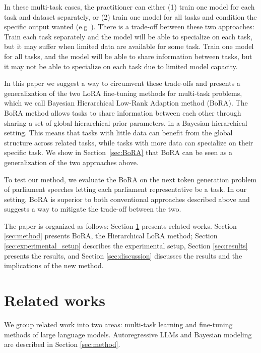 \documentclass[fullpaper]{nldl}
\begin{document}
In these multi-task cases, the practitioner can either (1) train one model for each task and dataset separately, or (2) train one model for all tasks and condition the specific output wanted (e.g~\cite{Raffel2019}).
There is a trade-off between these two approaches: Train each task separately and the model will be able to specialize on each task, but it may suffer when limited data are available for some task. Train one model for all tasks, and the model will be able to share information between tasks, but it may not be able to specialize on each task due to limited model capacity.

In this paper we suggest a way to circumvent these trade-offs and presents a generalization of the two LoRA fine-tuning methods for multi-task problems, which we call Bayesian Hierarchical Low-Rank Adaption method (BoRA).
The BoRA method allows tasks to share information between each other through sharing a set of global hierarchical prior parameters, in a Bayesian hierarchical setting. 
This means that tasks with little data can benefit from the global structure across related tasks, while tasks with more data can specialize on their specific task.
We show in Section~\ref{sec:BoRA} that BoRA can be seen as a generalization of the two approaches above.

To test our method, we evaluate the BoRA on the next token generation problem of parliament speeches letting each parliament representative be a task. In our setting, BoRA is superior to both conventional approaches described above and suggests a way to mitigate the trade-off between the two.

The paper is organized as follows: Section \ref{sec:related_works} presents related works. Section \ref{sec:method} presents BoRA, the Hierarchical LoRA method; Section \ref{sec:experimental_setup} describes the experimental setup, Section \ref{sec:results} presents the results, and Section \ref{sec:discussion} discusses the results and the implications of the new method.



\section{Related works} \label{sec:related_works}
We group related work into two areas: multi-task learning and fine-tuning methods of large language models. Autoregressive LLMs and Bayesian modeling are described in Section \ref{sec:method}.
\end{document}
